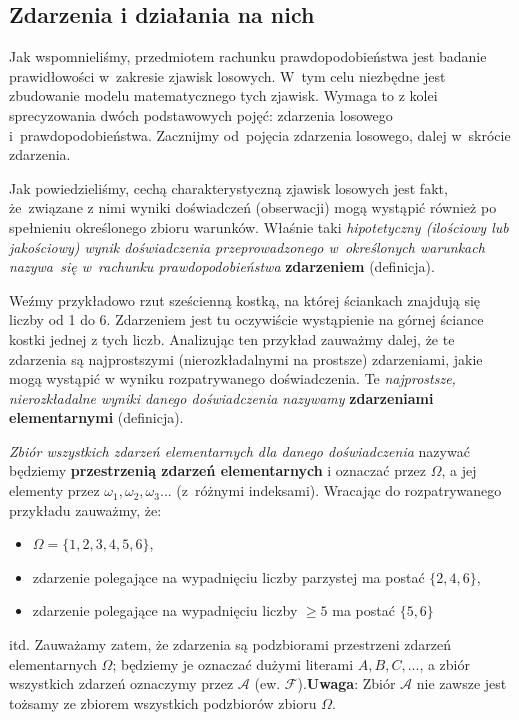 \documentclass[10pt,a4paper]{article}
\begin{document}
\subsection{Zdarzenia i działania na nich}
Jak wspomnieliśmy, przedmiotem rachunku prawdopodobieństwa jest badanie
prawidłowości w~zakresie zjawisk losowych. W~tym celu niezbędne jest zbudowanie
modelu matematycznego tych zjawisk. Wymaga to z kolei sprecyzowania dwóch
podstawowych pojęć: zdarzenia losowego i~prawdopodobieństwa. Zacznijmy
od~pojęcia zdarzenia losowego, dalej w~skrócie zdarzenia.

Jak powiedzieliśmy, cechą charakterystyczną zjawisk losowych jest fakt,
że~związane z nimi wyniki doświadczeń (obserwacji) mogą wystąpić również
po spełnieniu określonego zbioru warunków. Właśnie taki \textit{hipotetyczny
 (ilościowy lub jakościowy) wynik doświadczenia przeprowadzonego w~określonych
warunkach nazywa~się w~rachunku prawdopodobieństwa} \textbf{zdarzeniem} (definicja).

Weźmy przykładowo rzut sześcienną kostką, na której ściankach znajdują się liczby od 1 do 6. Zdarzeniem jest tu oczywiście wystąpienie na górnej ściance kostki jednej z tych liczb. Analizując ten przykład zauważmy dalej, że te zdarzenia są najprostszymi (nierozkładalnymi na prostsze) zdarzeniami, jakie mogą wystąpić w wyniku rozpatrywanego doświadczenia. Te \textit{najprostsze, nierozkładalne wyniki danego doświadczenia nazywamy} \textbf{zdarzeniami elementarnymi} (definicja).

\textit{Zbiór wszystkich zdarzeń elementarnych dla danego doświadczenia} nazywać będziemy \textbf{przestrzenią zdarzeń elementarnych} i oznaczać przez $\Omega$, a jej elementy przez $\omega_1, \omega_2, \omega_3...$ (z~różnymi indeksami).
Wracając do rozpatrywanego przykładu zauważmy, że:
\begin{itemize}
\item $\Omega = \{1, 2, 3, 4, 5, 6\}$,
\item zdarzenie polegające na wypadnięciu liczby parzystej ma postać $\{2,4,6\}$,
\item zdarzenie polegające na wypadnięciu liczby $\geq5$ ma postać $\{5, 6\}$
\end{itemize}
itd. Zauważamy zatem, że zdarzenia są podzbiorami przestrzeni zdarzeń elementarnych $\Omega$; będziemy je oznaczać dużymi literami $A, B, C, ...$, a zbiór wszystkich zdarzeń oznaczymy przez $\mathscr{A}$ (ew. $\mathscr{F}$).\textbf{Uwaga}: Zbiór $\mathscr{A}$ nie zawsze jest tożsamy ze zbiorem wszystkich podzbiorów zbioru $\Omega$.
\end{document}
